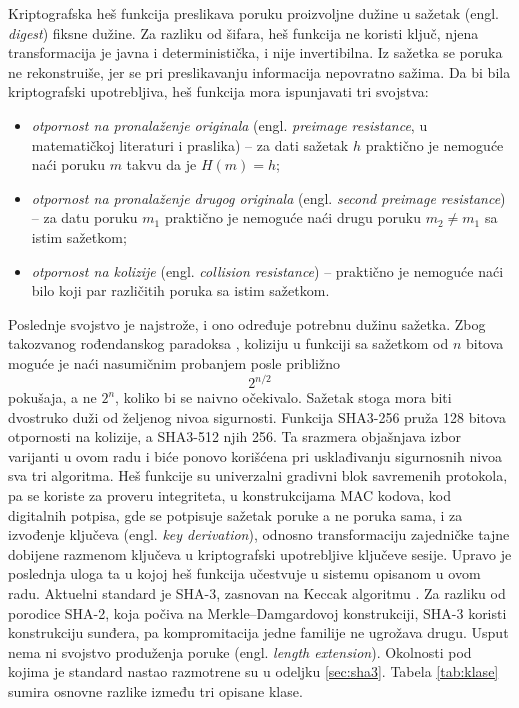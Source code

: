 Kriptografska heš funkcija preslikava poruku proizvoljne dužine u sažetak (engl. \textit{digest}) fiksne dužine. Za razliku od šifara, heš funkcija ne koristi ključ, njena transformacija je javna i deterministička, i nije invertibilna. Iz sažetka se poruka ne rekonstruiše, jer se pri preslikavanju informacija nepovratno sažima.
\smallbreak
Da bi bila kriptografski upotrebljiva, heš funkcija mora ispunjavati tri svojstva:
\begin{itemize}[itemsep=2pt]
    \item \textit{otpornost na pronalaženje originala} (engl. \textit{preimage resistance}, u matematičkoj literaturi i praslika) -- za dati sažetak $h$ praktično je nemoguće naći poruku $m$ takvu da je $H(m)=h$;
    \item \textit{otpornost na pronalaženje drugog originala} (engl. \textit{second preimage resistance}) -- za datu poruku $m_1$ praktično je nemoguće naći drugu poruku $m_2 \neq m_1$ sa istim sažetkom;
    \item \textit{otpornost na kolizije} (engl. \textit{collision resistance}) -- praktično je nemoguće naći bilo koji par različitih poruka sa istim sažetkom.
\end{itemize}
\smallbreak
Poslednje svojstvo je najstrože, i ono određuje potrebnu dužinu sažetka. Zbog takozvanog rođendanskog paradoksa \cite{paar_pelzl}, koliziju u funkciji sa sažetkom od $n$ bitova moguće je naći nasumičnim probanjem posle približno
\begin{equation}
    2^{n/2}
    \label{eq:rodjendanska_granica}
\end{equation}
pokušaja, a ne $2^{n}$, koliko bi se naivno očekivalo. Sažetak stoga mora biti dvostruko duži od željenog nivoa sigurnosti. Funkcija SHA3-256 pruža 128 bitova otpornosti na kolizije, a SHA3-512 njih 256. Ta srazmera objašnjava izbor varijanti u ovom radu i biće ponovo korišćena pri usklađivanju sigurnosnih nivoa sva tri algoritma.
\smallbreak
Heš funkcije su univerzalni gradivni blok savremenih protokola, pa se koriste za proveru integriteta, u konstrukcijama MAC kodova, kod digitalnih potpisa, gde se potpisuje sažetak poruke a ne poruka sama, i za izvođenje ključeva (engl. \textit{key derivation}), odnosno transformaciju zajedničke tajne dobijene razmenom ključeva u kriptografski upotrebljive ključeve sesije. Upravo je poslednja uloga ta u kojoj heš funkcija učestvuje u sistemu opisanom u ovom radu.
\smallbreak
Aktuelni standard je SHA-3, zasnovan na Keccak algoritmu \cite{fips202}. Za razliku od porodice SHA-2, koja počiva na Merkle--Damgardovoj konstrukciji, SHA-3 koristi konstrukciju sunđera, pa kompromitacija jedne familije ne ugrožava drugu. Usput nema ni svojstvo produženja poruke (engl. \textit{length extension}). Okolnosti pod kojima je standard nastao razmotrene su u odeljku \ref{sec:sha3}.
\smallbreak
Tabela \ref{tab:klase} sumira osnovne razlike između tri opisane klase.

